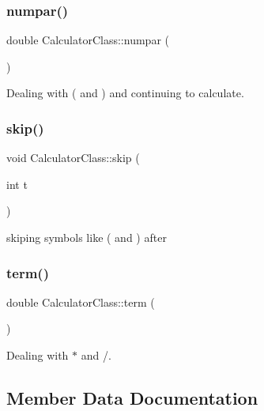 \subsubsection{\texorpdfstring{numpar()}{numpar()}}
{\footnotesize\ttfamily double Calculator\+Class\+::numpar (\begin{DoxyParamCaption}{ }\end{DoxyParamCaption})\hspace{0.3cm}{\ttfamily [private]}}



Dealing with ( and ) and continuing to calculate. 

\mbox{\label{class_calculator_class_a5f90ae6f846a004d51d9eacec3340370}} 
\subsubsection{\texorpdfstring{skip()}{skip()}}
{\footnotesize\ttfamily void Calculator\+Class\+::skip (\begin{DoxyParamCaption}\item[{int}]{t }\end{DoxyParamCaption})\hspace{0.3cm}{\ttfamily [private]}}



skiping symbols like ( and ) after 

\mbox{\label{class_calculator_class_ad61dfc91b354cc8c9dc45c8ee47a11d5}} 
\subsubsection{\texorpdfstring{term()}{term()}}
{\footnotesize\ttfamily double Calculator\+Class\+::term (\begin{DoxyParamCaption}{ }\end{DoxyParamCaption})\hspace{0.3cm}{\ttfamily [private]}}



Dealing with $\ast$ and /. 



\subsection{Member Data Documentation}
\mbox{\label{class_calculator_class_aac8875c105e259165e83fe627221cfcd}} 
